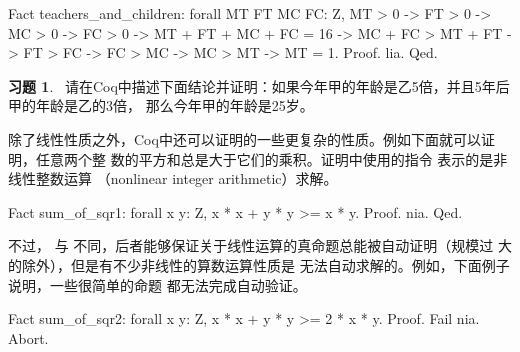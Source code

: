 \documentclass{article}[margin=1pt]
\theoremstyle{definition}
\newtheorem{ex}{习题}
\begin{document}
\begin{mytext5}
Fact teachers_and_children: forall MT FT MC FC: Z,
  MT > 0 ->
  FT > 0 ->
  MC > 0 ->
  FC > 0 ->
  MT + FT + MC + FC = 16 ->
  MC + FC > MT + FT ->
  FT > FC ->
  FC > MC ->
  MC > MT ->
  MT = 1.
Proof. lia. Qed.


\end{mytext5}
\noindent

\begin{ex} \
 请在Coq中描述下面结论并证明：如果今年甲的年龄是乙5倍，并且5年后甲的年龄是乙的3倍，
    那么今年甲的年龄是25岁。

\end{ex}

 除了线性性质之外，Coq中还可以证明的一些更复杂的性质。例如下面就可以证明，任意两个整
    数的平方和总是大于它们的乘积。证明中使用的指令  表示的是非线性整数运算
    （nonlinear integer arithmetic）求解。

\begin{mytext6}
Fact sum_of_sqr1: forall x y: Z,
  x * x + y * y >= x * y.
Proof. nia. Qed.


\end{mytext6}
\noindent

 不过，  与  不同，后者能够保证关于线性运算的真命题总能被自动证明（规模过
    大的除外），但是有不少非线性的算数运算性质是  无法自动求解的。例如，下面例子说明，一些很简单的命题 \Colorbox{mygray}{\lstinline[style=INLINE]{nia}} 都无法完成自动验证。

\begin{mytext7}
Fact sum_of_sqr2: forall x y: Z,
  x * x + y * y >= 2 * x * y.
Proof. Fail nia. Abort.


\end{mytext7}
\noindent
\end{document}
